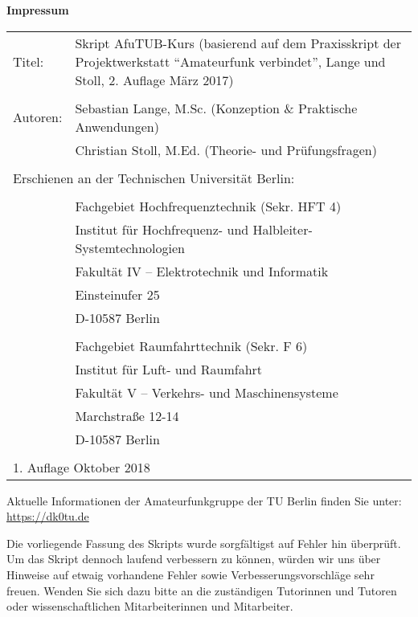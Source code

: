 \thispagestyle{empty}

\hspace{.1cm}
\begin{minipage}[t]{13cm}

  \textbf{Impressum}\\

  \begin{tabular}{p{1cm} p{11cm}}
    Titel: &  Skript AfuTUB-Kurs (basierend auf dem Praxisskript der
    Projektwerkstatt "`Amateurfunk verbindet"', Lange und Stoll, 2.  Auflage
    März 2017)\\
    & \\
    Autoren: & Sebastian Lange, M.Sc. (Konzeption \& Praktische Anwendungen)\\
    & Christian Stoll, M.Ed. (Theorie- und Prüfungsfragen)\\
    & \\
    \multicolumn{2}{l}{Erschienen an der Technischen Universität Berlin:}\\
    &\\
    & Fachgebiet Hochfrequenztechnik (Sekr. HFT 4)\\
    & Institut für Hochfrequenz- und Halbleiter-Systemtechnologien\\
    & Fakultät IV -- Elektrotechnik und Informatik \\
    & Einsteinufer 25 \\
    & D-10587 Berlin \\
    & \\
    & Fachgebiet Raumfahrttechnik (Sekr. F 6)\\
    & Institut für Luft- und Raumfahrt\\
    & Fakultät V -- Verkehrs- und Maschinensysteme\\
    & Marchstraße 12-14\\
    & D-10587 Berlin\\
    &\\
    \multicolumn{2}{l}{1. Auflage Oktober 2018}\\
  \end{tabular}

  \vspace{3cm}

  Aktuelle Informationen der Amateurfunkgruppe der TU Berlin finden Sie unter:\\
  \url{https://dk0tu.de}

  \vspace{1cm}

  Die vorliegende Fassung des Skripts wurde sorgfältigst auf Fehler hin
  überprüft. Um das Skript dennoch laufend verbessern zu können, würden wir uns
  über Hinweise auf etwaig vorhandene Fehler sowie Verbesserungsvorschläge sehr
  freuen. Wenden Sie sich dazu bitte an die zuständigen Tutorinnen und Tutoren
  oder wissenschaftlichen Mitarbeiterinnen und Mitarbeiter.

\end{minipage}


